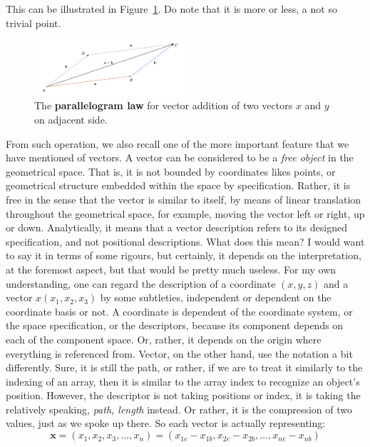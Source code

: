 This can be illustrated in Figure~\ref{fig:vector_sum_parallel}. Do note that it is more or less, a not so trivial point. 
\begin{figure}[h!]
    \centering
    \includegraphics[width=0.5\textwidth]{img/vector_sum-001.png}
    \caption{The \textbf{parallelogram law} for vector addition of two vectors $x$ and $y$ on adjacent side.}
    \label{fig:vector_sum_parallel}
\end{figure}
From such operation, we also recall one of the more important feature that we have mentioned of vectors. A vector can be considered to be a \textit{free object} in the geometrical space. That is, it is not bounded by coordinates likes points, or geometrical structure embedded within the space by specification. Rather, it is free in the sense that the vector is similar to itself, by means of linear translation throughout the geometrical space, for example, moving the vector left or right, up or down. Analytically, it means that a vector description refers to its designed specification, and not positional descriptions. What does this mean? I would want to say it in terms of some rigours, but certainly, it depends on the interpretation, at the foremost aspect, but that would be pretty much useless. For my own understanding, one can regard the description of a coordinate $(x,y,z)$ and a vector $x(x_1, x_2, x_3)$ by some subtleties, independent or dependent on the coordinate basis or not. A coordinate is dependent of the coordinate system, or the space specification, or the descriptors, because its component depends on each of the component space. Or, rather, it depends on the origin where everything is referenced from. Vector, on the other hand, use the notation a bit differently. Sure, it is still the path, or rather, if we are to treat it similarly to the indexing of an array, then it is similar to the array index to recognize an object's position. However, the descriptor is not taking positions or index, it is taking the relatively speaking, \textit{path, length} instead. Or rather, it is the compression of two values, just as we spoke up there. So each vector is actually representing: 
\begin{equation}
    \mathbf{x} = (x_{1},x_{2},x_{3},\dots,x_{n}) = (x_{1e}- x_{1b}, x_{2e}- x_{2b},\dots, x_{ne}- x_{nb}) 
\end{equation}
